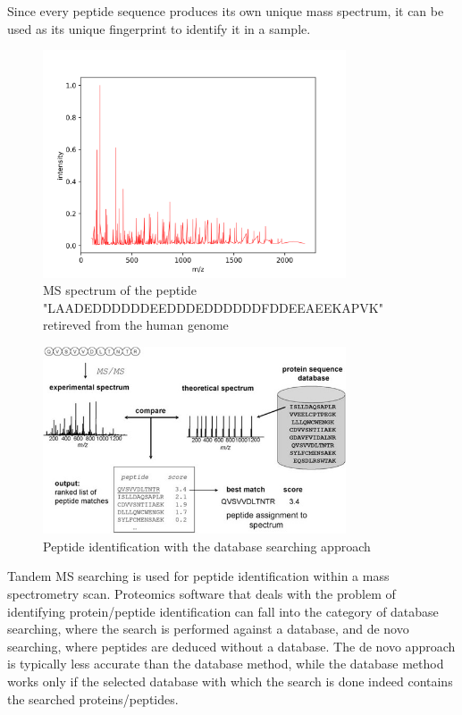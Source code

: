 \documentclass[11pt]{article}
\begin{document}
Since every peptide sequence produces its own unique mass spectrum, it can be used as its unique fingerprint to identify it in a sample.
\begin{figure}[ht]
\centering
\includegraphics[width=0.8\textwidth]{figs/peptide.png}
\caption{MS spectrum of the peptide "LAADEDDDDDDEEDDDEDDDDDDFDDEEAEEKAPVK" retireved from the human genome}
\label{fig:peptide-example}
\end{figure}
\begin{figure}[ht]
\centering
\includegraphics[width=0.8\textwidth]{figs/database_search.jpg}
\caption{Peptide identification with the database searching approach \cite{Nesvizhskii2007}}
\label{fig:database-search}
\end{figure}
Tandem MS searching is used for peptide identification within a mass spectrometry scan. Proteomics software that deals with the problem of identifying protein/peptide identification can fall into the category of database searching, where the search is performed against a database, and de novo searching, where peptides are deduced without a database. The de novo approach is typically less accurate than the database method, while the database method works only if the selected database with which the search is done indeed contains the searched proteins/peptides.
\end{document}
